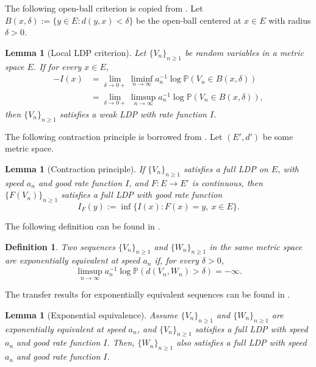 \documentclass[a4paper, 11pt]{article}
\newcommand{\1}{\mathbf 1}
\theoremstyle{plain}
\newtheorem{lemma}[theorem]{Lemma}
\newtheorem{definition}[theorem]{Definition}
\begin{document}
The following open-ball criterion is copied from
\cite[Theorem~4.1.11]{DemboZeitouni2010}. Let $B(x,\delta):=\{y\in E: d(y,x)<\delta\}$ be the open-ball centered at $x\in E$ with radius $\delta>0$.

\begin{lemma}[Local LDP criterion]\label{lem:local-LDP}
Let \(\{V_n\}_{n\geq1}\) be random variables in a metric space \(E\). If for every
\(x\in E\),
\begin{align*}
  -I(x)
  &=
  \lim_{\delta\to0+}\liminf_{n\to\infty}
  a_n^{-1}\log\mathbb{P}(V_n\in B(x,\delta))\\
  &=
  \lim_{\delta\to0+}\limsup_{n\to\infty}
  a_n^{-1}\log\mathbb{P}(V_n\in B(x,\delta)),
\end{align*}
then \(\{V_n\}_{n\geq1}\) satisfies a weak LDP with rate function \(I\).
\end{lemma}
The following contraction principle is borrowed from \cite[Theorem~4.2.1]{DemboZeitouni2010}. Let $(E',d')$ be some metric space.
\begin{lemma}[Contraction principle]\label{lem:contraction}
If \(\{V_n\}_{n\geq1}\) satisfies a full LDP on \(E\), with speed \(a_n\) and good rate function
\(I\), and \(F:E\to E'\) is continuous, then \(\{F(V_n)\}_{n\geq1}\) satisfies a full
LDP with good rate function
\[
  I_F(y):=\inf\{I(x):F(x)=y,~x\in E \}.
\]
\end{lemma}
The following definition can be found in \cite[Definition 4.2.10]{DemboZeitouni2010}.
\begin{definition}\label{4grtet6y6yf}
Two sequences \(\{V_n\}_{n\geq1}\) and \(\{W_n\}_{n\geq1}\) in the same metric space are exponentially
equivalent at speed \(a_n\) if, for every \(\delta>0\),
\[
  \limsup_{n\to\infty}a_n^{-1}
  \log\mathbb{P}(d(V_n,W_n)>\delta)=-\infty.
\]
\end{definition}

The transfer results for exponentially equivalent sequences can be found in
\cite[Theorem~4.2.13]{DemboZeitouni2010}.

\begin{lemma}[Exponential equivalence]\label{lem:exp-equivalence-transfer}
Assume \(\{V_n\}_{n\geq1}\) and \(\{W_n\}_{n\geq1}\) are exponentially
equivalent at speed \(a_n\), and \(\{V_n\}_{n\geq1}\) satisfies a full LDP with speed \(a_n\) and good rate function
\(I\). Then, \(\{W_n\}_{n\geq1}\) also satisfies a full LDP with speed \(a_n\) and good rate function
\(I\).
\end{lemma}
\end{document}
